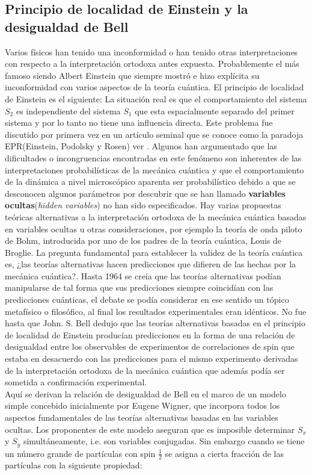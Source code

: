 \documentclass[a4paper]{article}
\begin{document}
\subsection{Principio de localidad de Einstein y la desigualdad de Bell}
Varios físicos han tenido una inconformidad o han tenido otras interpretaciones con respecto a la interpretación ortodoxa antes expuesta. Probablemente el más famoso siendo Albert Einstein que siempre mostró e hizo explícita su inconformidad con varios aspectos de la teoría cuántica. El principio de localidad de Einstein es el siguiente: La situación real es que el comportamiento del sistema $S_2$ es independiente del sistema $S_1$ que esta espacialmente separado del primer sistema y por lo tanto no tiene una influencia directa. Este problema fue discutido por primera vez en un artículo seminal que se conoce como la paradoja EPR(Einstein, Podolsky y Rosen) ver \cite{Einstein}. Algunos han argumentado que las dificultades o incongruencias encontradas en este fenómeno son inherentes de las interpretaciones probabilísticas de la mecánica cuántica y que el comportamiento de la dinámica a nivel microscópico aparenta ser probabilístico debido a que se desconocen algunos parámetros por descubrir que se han llamado \textbf{variables ocultas}(\textit{hidden variables}) no han sido especificados. Hay varias propuestas teóricas alternativas a la interpretación ortodoxa de la mecánica cuántica basadas en variables ocultas u otras consideraciones, por ejemplo la teoría de onda piloto de Bohm, introducida por uno de los padres de la teoría cuántica, Louis de Broglie. La pregunta fundamental para establecer la validez de la teoría cuántica es, ¿las teorías alternativas hacen predicciones que difieren de las hechas por la mecánica cuántica?. Hasta 1964 se creía que las teorías alternativas podían manipularse de tal forma que sus predicciones siempre coincidían  con las predicciones cuánticas, el debate se podía considerar en ese sentido un tópico metafísico o filosófico, al final los resultados experimentales eran idénticos. No fue hasta que John. S. Bell dedujo que las teorías alternativas basadas en el principio de localidad de Einstein producían predicciones en la forma de una relación de desigualdad entre los observables de experimentos de correlaciones de spin que estaba en desacuerdo con las predicciones para el mismo experimento derivadas de la interpretación ortodoxa de la mecánica cuántica que además podía ser sometida a confirmación experimental.\\
Aquí se derivan la relación de desigualdad de Bell en el marco de un modelo simple concebido inicialmente por Eugene Wigner, que incorpora todos los aspectos fundamentales de las teorías alternativas basadas en las variables ocultas. Los proponentes de este modelo aseguran que es imposible determinar $S_x$ y $S_y$ simultáneamente, i.e. son variables conjugadas. Sin embargo cuando se tiene un número grande de partículas con spin $\frac{1}{2}$ se asigna a cierta fracción de las partículas con la siguiente propiedad:
\end{document}
